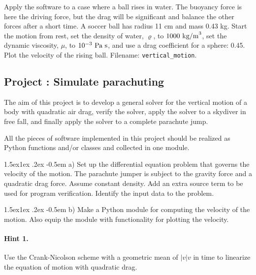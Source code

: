 \documentclass[%
oneside,                 %
final,                   %
10pt]{article}
\makeatletter
\newenvironment{doconceexercise}{}{}
\newcounter{doconceexercisecounter}
\newcommand\subex{\@startsection{paragraph}{4}{\z@}%
                  {1.5ex\@plus1ex \@minus.2ex}%
                  {-0.5em}%
                  {\normalfont\normalsize\bfseries}}
\makeatother
\begin{document}
\begin{doconceexercise}
Apply the software to a case where a ball rises in water.  The
buoyancy force is here the driving force, but the drag will be
significant and balance the other forces after a short time.  A soccer
ball has radius 11 cm and mass 0.43 kg.  Start the motion from rest, set
the density of water, $\varrho$, to $1000\hbox{ kg/m}^3$, set the
dynamic viscosity, $\mu$, to $10^{-3}\hbox{ Pa s}$, and use a drag
coefficient for a sphere: 0.45. Plot the velocity of the rising ball.
\noindent Filename: \Verb!vertical_motion!.

\end{doconceexercise}




\begin{doconceexercise}

\subsection*{Project \thedoconceexercisecounter: Simulate parachuting}

\label{decay:app:exer:parachute}

The aim of this project is to develop a general solver for the
vertical motion of a body with quadratic air drag, verify the solver,
apply the solver to a skydiver in free fall, and finally apply the
solver to a complete parachute jump.

All the pieces of software implemented in this project should be
realized as Python functions and/or classes and collected in one
module.


\subex{a)}
Set up the differential equation problem that governs the velocity
of the motion.
The parachute jumper is subject to the gravity force and a quadratic
drag force. Assume constant density.
Add an extra source term to be used for program verification.
Identify the input data to the problem.

\subex{b)}
Make a Python module for computing the velocity of the motion.
Also equip the module with functionality for plotting the velocity.


\paragraph{Hint 1.}
Use the Crank-Nicolson scheme with a geometric mean of $|v|v$ in time to
linearize the equation of motion with quadratic drag.


\end{doconceexercise}
\end{document}

